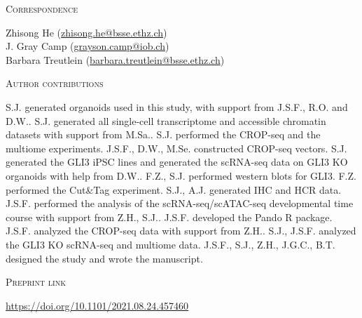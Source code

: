 \vspace{1cm}

\noindent
{\large\textsc{Correspondence}} 

\noindent
Zhisong He (\href{mailto:zhisong.he@bsse.ethz.ch}{zhisong.he@bsse.ethz.ch})\\
J. Gray Camp (\href{mailto:grayson.camp@iob.ch}{grayson.camp@iob.ch})\\
Barbara Treutlein (\href{mailto:barbara.treutlein@bsse.ethz.ch}{barbara.treutlein@bsse.ethz.ch})

\vspace{1cm}

\noindent
{\large\textsc{Author contributions}} 

\noindent
S.J. generated organoids used in this study, with support from J.S.F., R.O. and D.W.. S.J. generated all single-cell transcriptome and accessible chromatin datasets with support from M.Sa.. S.J. performed the CROP-seq and the multiome experiments. J.S.F., D.W., M.Se. constructed CROP-seq vectors. S.J. generated the GLI3 iPSC lines and generated the scRNA-seq data on GLI3 KO organoids with help from D.W.. F.Z., S.J. performed western blots for GLI3. F.Z. performed the Cut\&Tag experiment. S.J., A.J. generated IHC and HCR data. J.S.F. performed the analysis of the scRNA-seq/scATAC-seq developmental time course with support from Z.H., S.J.. J.S.F. developed the Pando R package. J.S.F. analyzed the CROP-seq data with support from Z.H.. S.J., J.S.F. analyzed the GLI3 KO scRNA-seq and multiome data. J.S.F., S.J., Z.H., J.G.C., B.T. designed the study and wrote the manuscript.

\vspace{1cm}

\noindent
{\large\textsc{Preprint link}} 

\noindent
\href{https://doi.org/10.1101/2021.08.24.457460}{https://doi.org/10.1101/2021.08.24.457460}



